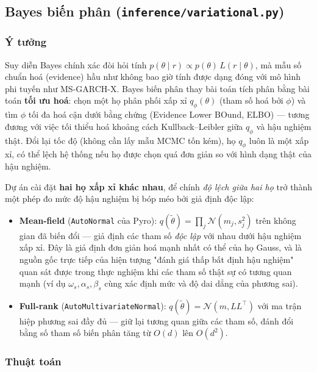 \documentclass[11pt,a4paper]{article}
\newcommand{\code}[1]{\texttt{#1}}
\newcommand{\file}[1]{\texttt{#1}}
\begin{document}
\subsection{Bayes biến phân (\file{inference/variational.py})}

\subsubsection{Ý tưởng}

Suy diễn Bayes chính xác đòi hỏi tính $p(\theta\mid r) \propto p(\theta)\,L(r\mid
\theta)$, mà mẫu số chuẩn hoá (evidence) hầu như không bao giờ tính được dạng đóng
với mô hình phi tuyến như MS-GARCH-X. Bayes biến phân thay bài toán tích phân bằng
bài toán \textbf{tối ưu hoá}: chọn một họ phân phối xấp xỉ $q_\phi(\theta)$ (tham số
hoá bởi $\phi$) và tìm $\phi$ tối đa hoá cận dưới bằng chứng (Evidence Lower BOund,
ELBO) --- tương đương với việc tối thiểu hoá khoảng cách Kullback--Leibler giữa
$q_\phi$ và hậu nghiệm thật. Đổi lại tốc độ (không cần lấy mẫu MCMC tốn kém), họ
$q_\phi$ luôn là một xấp xỉ, có thể lệch hệ thống nếu họ được chọn quá đơn giản so
với hình dạng thật của hậu nghiệm.

Dự án cài đặt \textbf{hai họ xấp xỉ khác nhau}, để chính \emph{độ lệch giữa hai họ}
trở thành một phép đo mức độ hậu nghiệm bị bóp méo bởi giả định độc lập:

\begin{itemize}
  \item \textbf{Mean-field} (\code{AutoNormal} của Pyro): $q(\tilde\theta) =
    \prod_j \mathcal N(m_j, s_j^2)$ trên không gian đã biến đổi --- giả định các
    tham số \emph{độc lập} với nhau dưới hậu nghiệm xấp xỉ. Đây là giả định đơn giản
    hoá mạnh nhất có thể của họ Gauss, và là nguồn gốc trực tiếp của hiện tượng
    "đánh giá thấp bất định hậu nghiệm" quan sát được trong thực nghiệm khi các tham
    số thật sự có tương quan mạnh (ví dụ $\omega_s,\alpha_s,\beta_s$ cùng xác định
    mức và độ dai dẳng của phương sai).
  \item \textbf{Full-rank} (\code{AutoMultivariateNormal}): $q(\tilde\theta) =
    \mathcal N(m, LL^\top)$ với ma trận hiệp phương sai đầy đủ --- giữ lại tương quan
    giữa các tham số, đánh đổi bằng số tham số biến phân tăng từ $O(d)$ lên $O(d^2)$.
\end{itemize}

\subsubsection{Thuật toán}
\end{document}

